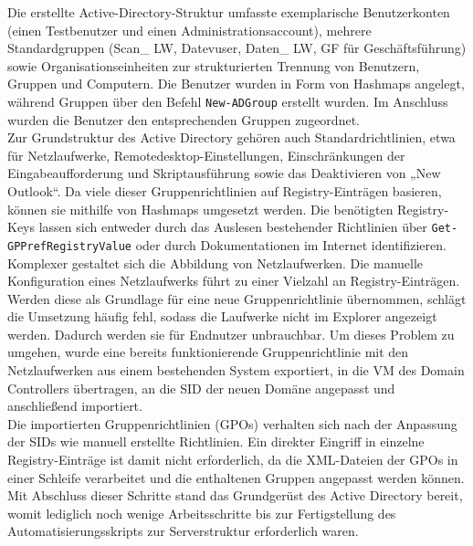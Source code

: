 \documentclass[a4paper,12pt]{article}
\begin{document}
Die erstellte Active-Directory-Struktur umfasste exemplarische Benutzerkonten (einen Testbenutzer und einen Administrationsaccount), mehrere Standardgruppen (Scan\_ LW, Datevuser, Daten\_ LW, GF für Geschäftsführung) sowie Organisationseinheiten zur strukturierten Trennung von Benutzern, Gruppen und Computern. 
Die Benutzer wurden in Form von Hashmaps angelegt, während Gruppen über den Befehl \lstinline|New-ADGroup| erstellt wurden. 
Im Anschluss wurden die Benutzer den entsprechenden Gruppen zugeordnet.\\

Zur Grundstruktur des Active Directory gehören auch Standardrichtlinien, etwa für Netzlaufwerke, Remotedesktop-Einstellungen, Einschränkungen der Eingabeaufforderung und Skriptausführung sowie das Deaktivieren von „New Outlook“. 
Da viele dieser Gruppenrichtlinien auf Registry-Einträgen basieren, können sie mithilfe von Hashmaps umgesetzt werden. 
Die benötigten Registry-Keys lassen sich entweder durch das Auslesen bestehender Richtlinien über \lstinline|Get-GPPrefRegistryValue| oder durch Dokumentationen im Internet identifizieren.\\

Komplexer gestaltet sich die Abbildung von Netzlaufwerken. Die manuelle Konfiguration eines Netzlaufwerks führt zu einer Vielzahl an Registry-Einträgen. 
Werden diese als Grundlage für eine neue Gruppenrichtlinie übernommen, schlägt die Umsetzung häufig fehl, sodass die Laufwerke nicht im Explorer angezeigt werden. 
Dadurch werden sie für Endnutzer unbrauchbar. 
Um dieses Problem zu umgehen, wurde eine bereits funktionierende Gruppenrichtlinie mit den Netzlaufwerken aus einem bestehenden System exportiert, in die VM des Domain Controllers übertragen, an die SID der neuen Domäne angepasst und anschließend importiert.\\

Die importierten Gruppenrichtlinien (GPOs) verhalten sich nach der Anpassung der SIDs wie manuell erstellte Richtlinien. 
Ein direkter Eingriff in einzelne Registry-Einträge ist damit nicht erforderlich, da die XML-Dateien der GPOs in einer Schleife verarbeitet und die enthaltenen Gruppen angepasst werden können. 
Mit Abschluss dieser Schritte stand das Grundgerüst des Active Directory bereit, womit lediglich noch wenige Arbeitsschritte bis zur Fertigstellung des Automatisierungsskripts zur Serverstruktur erforderlich waren.\\
\end{document}

